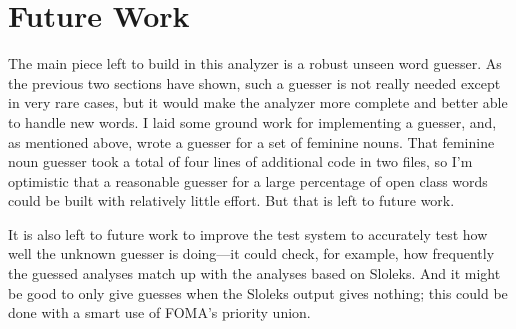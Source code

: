 \documentclass[11pt,letterpaper]{article}
\begin{document}
\section{Future Work}

The main piece left to build in this analyzer is a robust unseen word guesser.
As the previous two sections have shown, such a guesser is not really needed
except in very rare cases, but it would make the analyzer more complete and
better able to handle new words.  I laid some ground work for implementing a
guesser, and, as mentioned above, wrote a guesser for a set of feminine nouns.
That feminine noun guesser took a total of four lines of additional code in two
files, so I'm optimistic that a reasonable guesser for a large percentage of
open class words could be built with relatively little effort.  But that is
left to future work.

It is also left to future work to improve the test system to accurately test
how well the unknown guesser is doing---it could check, for example, how
frequently the guessed analyses match up with the analyses based on Sloleks.
And it might be good to only give guesses when the Sloleks output gives
nothing; this could be done with a smart use of FOMA's priority union.



\label{lastpage}
\end{document}
